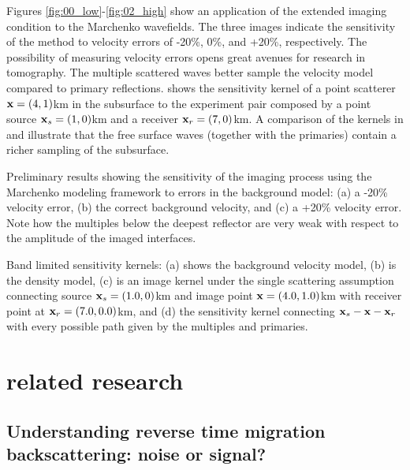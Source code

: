Figures \ref{fig:00_low}-\ref{fig:02_high} show an application of the extended imaging
condition to the Marchenko wavefields. The three images indicate the sensitivity of the 
method to velocity errors of -20\%, 0\%, and +20\%, respectively. 
 The possibility of measuring velocity errors opens great avenues for research 
in tomography. The multiple scattered waves better sample the velocity model compared
to primary reflections.  shows the sensitivity kernel of 
a point scatterer ${\bf x}=(4,1)$km in the subsurface to the experiment pair composed
by a point source ${\bf x}_s=(1,0)$km and a receiver ${\bf x}_r=(7,0)$km. 
A comparison of the kernels in  and  
illustrate that the free surface waves (together with the primaries) 
contain a richer sampling of the subsurface.






%
{Preliminary results showing the sensitivity of the imaging process using the Marchenko modeling 
framework to errors in the background model: (a) a -20\% velocity error, (b) the correct 
background velocity, and (c) a +20\% velocity error. Note how the multiples below the deepest
reflector are very weak with respect to the amplitude of the imaged interfaces. }

%
{Band limited sensitivity kernels: (a) shows the background velocity model, (b) is the density model, (c) is an image
kernel under the single scattering assumption connecting source ${\bf x}_s =(1.0,0)$km  and
  image point ${\bf x}=(4.0,1.0)$km with receiver point at ${\bf x}_r=(7.0,0.0)$km, and (d) the sensitivity 
kernel connecting ${\bf x}_s-{\bf x}-{\bf x}_r$ with every possible path given by the multiples and primaries. }




\section{related research}
\subsection{Understanding reverse time migration backscattering: noise or signal? \citep{DiazRTM}}

